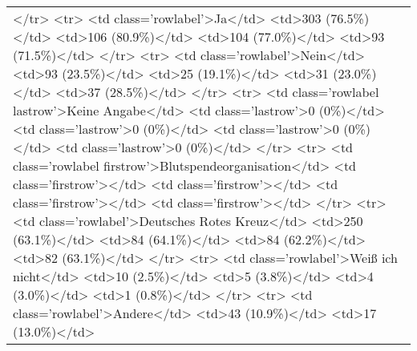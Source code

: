 \begin{table}[!tbp]
\begin{center}
\begin{tabular}{l}
\textless /tr\textgreater 
\textless tr\textgreater 
\textless td class='rowlabel'\textgreater Ja\textless /td\textgreater 
\textless td\textgreater 303 (76.5\%)\textless /td\textgreater 
\textless td\textgreater 106 (80.9\%)\textless /td\textgreater 
\textless td\textgreater 104 (77.0\%)\textless /td\textgreater 
\textless td\textgreater 93 (71.5\%)\textless /td\textgreater 
\textless /tr\textgreater 
\textless tr\textgreater 
\textless td class='rowlabel'\textgreater Nein\textless /td\textgreater 
\textless td\textgreater 93 (23.5\%)\textless /td\textgreater 
\textless td\textgreater 25 (19.1\%)\textless /td\textgreater 
\textless td\textgreater 31 (23.0\%)\textless /td\textgreater 
\textless td\textgreater 37 (28.5\%)\textless /td\textgreater 
\textless /tr\textgreater 
\textless tr\textgreater 
\textless td class='rowlabel lastrow'\textgreater Keine Angabe\textless /td\textgreater 
\textless td class='lastrow'\textgreater 0 (0\%)\textless /td\textgreater 
\textless td class='lastrow'\textgreater 0 (0\%)\textless /td\textgreater 
\textless td class='lastrow'\textgreater 0 (0\%)\textless /td\textgreater 
\textless td class='lastrow'\textgreater 0 (0\%)\textless /td\textgreater 
\textless /tr\textgreater 
\textless tr\textgreater 
\textless td class='rowlabel firstrow'\textgreater Blutspendeorganisation\textless /td\textgreater 
\textless td class='firstrow'\textgreater \textless /td\textgreater 
\textless td class='firstrow'\textgreater \textless /td\textgreater 
\textless td class='firstrow'\textgreater \textless /td\textgreater 
\textless td class='firstrow'\textgreater \textless /td\textgreater 
\textless /tr\textgreater 
\textless tr\textgreater 
\textless td class='rowlabel'\textgreater Deutsches Rotes Kreuz\textless /td\textgreater 
\textless td\textgreater 250 (63.1\%)\textless /td\textgreater 
\textless td\textgreater 84 (64.1\%)\textless /td\textgreater 
\textless td\textgreater 84 (62.2\%)\textless /td\textgreater 
\textless td\textgreater 82 (63.1\%)\textless /td\textgreater 
\textless /tr\textgreater 
\textless tr\textgreater 
\textless td class='rowlabel'\textgreater Weiß ich nicht\textless /td\textgreater 
\textless td\textgreater 10 (2.5\%)\textless /td\textgreater 
\textless td\textgreater 5 (3.8\%)\textless /td\textgreater 
\textless td\textgreater 4 (3.0\%)\textless /td\textgreater 
\textless td\textgreater 1 (0.8\%)\textless /td\textgreater 
\textless /tr\textgreater 
\textless tr\textgreater 
\textless td class='rowlabel'\textgreater Andere\textless /td\textgreater 
\textless td\textgreater 43 (10.9\%)\textless /td\textgreater 
\textless td\textgreater 17 (13.0\%)\textless /td\textgreater 

\end{tabular}
\end{center}
\end{table}
